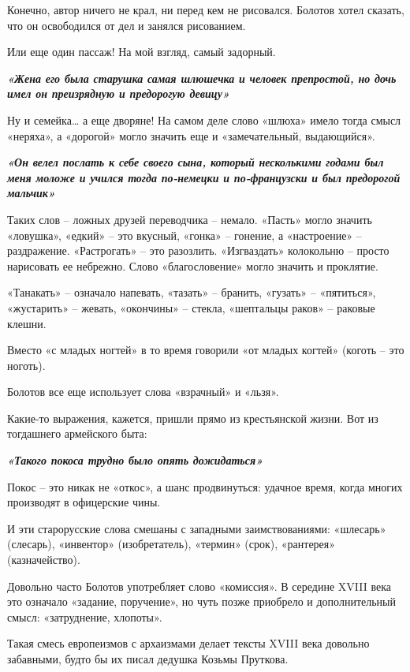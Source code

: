 Конечно, автор ничего не крал, ни перед кем не рисовался. Болотов хотел
сказать, что он освободился от дел и занялся рисованием.

Или еще один пассаж! На мой взгляд, самый задорный.

\begin{leftbar}
  \begingroup
    \em\Large\bfseries\color{blue}
    «Жена его была старушка самая шлюшечка и человек препростой, но дочь имел он преизрядную и предорогую девицу»
  \endgroup
\end{leftbar}

Ну и семейка… а еще дворяне! На самом деле слово «шлюха» имело тогда смысл
«неряха», а «дорогой» могло значить еще и «замечательный, выдающийся».

\begin{leftbar}
  \begingroup
    \em\Large\bfseries\color{blue}
«Он велел послать к себе своего сына, который несколькими годами был меня
моложе и учился тогда по-немецки и по-французски и был предорогой мальчик»
  \endgroup
\end{leftbar}

Таких слов – ложных друзей переводчика – немало. «Пасть» могло значить
«ловушка», «едкий» – это вкусный, «гонка» – гонение, а «настроение» –
раздражение. «Растрогать» – это разозлить. «Изгваздать» колокольню – просто
нарисовать ее небрежно. Слово «благословение» могло значить и проклятие.

«Танакать» – означало напевать, «тазать» – бранить, «гузать» – «пятиться»,
«жустарить» – жевать, «окончины» – стекла, «шептальцы раков» – раковые клешни.

Вместо «с младых ногтей» в то время говорили «от младых когтей» (коготь – это
ноготь).

Болотов все еще использует слова «взрачный» и «льзя».

Какие-то выражения, кажется, пришли прямо из крестьянской жизни. Вот из
тогдашнего армейского быта:

\begin{leftbar}
  \begingroup
    \em\Large\bfseries\color{blue}
    «Такого покоса трудно было опять дожидаться»
  \endgroup
\end{leftbar}

Покос – это никак не «откос», а шанс продвинуться: удачное время, когда многих
производят в офицерские чины.

И эти старорусские слова смешаны с западными заимствованиями: «шлесарь»
(слесарь), «инвентор» (изобретатель), «термин» (срок), «рантерея»
(казначейство).

Довольно часто Болотов употребляет слово «комиссия». В середине XVIII века это
означало «задание, поручение», но чуть позже приобрело и дополнительный смысл:
«затруднение, хлопоты».

Такая смесь европеизмов с архаизмами делает тексты XVIII века довольно
забавными, будто бы их писал дедушка Козьмы Пруткова.
